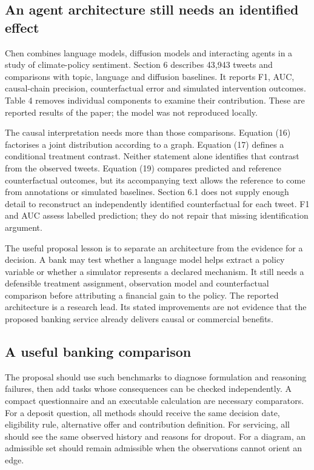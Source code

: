 \subsection{An agent architecture still needs an identified effect}
Chen combines language models, diffusion models and interacting agents in a
study of climate-policy sentiment. Section 6 describes 43,943 tweets and
comparisons with topic, language and diffusion baselines. It reports F1,
AUC, causal-chain precision, counterfactual error and simulated intervention
outcomes. Table 4 removes individual components to examine their contribution.
These are reported results of the paper; the model was not reproduced
locally. \citep[Sections 5.6 and 6; Tables 1--4]{gap29chen}

The causal interpretation needs more than those comparisons. Equation (16)
factorises a joint distribution according to a graph. Equation (17) defines
a conditional treatment contrast. Neither statement alone identifies that
contrast from the observed tweets. Equation (19) compares predicted and
reference counterfactual outcomes, but its accompanying text allows the
reference to come from annotations or simulated baselines. Section 6.1 does
not supply enough detail to reconstruct an independently identified
counterfactual for each tweet. F1 and AUC assess labelled prediction; they
do not repair that missing identification argument.

The useful proposal lesson is to separate an architecture from the evidence
for a decision. A bank may test whether a language model helps extract a
policy variable or whether a simulator represents a declared mechanism.
It still needs a defensible treatment assignment, observation model and
counterfactual comparison before attributing a financial gain to the policy.
The reported architecture is a research lead. Its stated improvements are
not evidence that the proposed banking service already delivers causal or
commercial benefits.

\subsection{A useful banking comparison}
The proposal should use such benchmarks to diagnose formulation and reasoning
failures, then add tasks whose consequences can be checked independently.
A compact questionnaire and an executable calculation are necessary
comparators. For a deposit question, all methods should receive the same
decision date, eligibility rule, alternative offer and contribution definition.
For servicing, all should see the same observed history and reasons for
dropout. For a diagram, an admissible set should remain admissible when the
observations cannot orient an edge.


